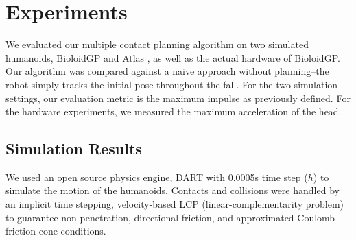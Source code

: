\section{Experiments}
We evaluated our multiple contact planning algorithm on two simulated
humanoids, BioloidGP \cite{BioloidGP:2014:URL} and Atlas
\cite{BD:2014:URL}, as well as the actual hardware of BioloidGP.  Our
algorithm was compared against a naive approach without planning--the
robot simply tracks the initial pose throughout the fall. For the two
simulation settings, our evaluation metric is the maximum impulse as
previously defined. For the hardware experiments, we measured the maximum
acceleration of the head.


\subsection{Simulation Results}
We used an open source physics engine, DART
\cite{DART:2014:URL,Liu:2012:STM} with 0.0005s time step ($h$) to
simulate the motion of the humanoids.  Contacts and collisions were
handled by an implicit time stepping, velocity-based LCP
(linear-complementarity problem) to guarantee non-penetration,
directional friction, and approximated Coulomb friction cone
conditions.


